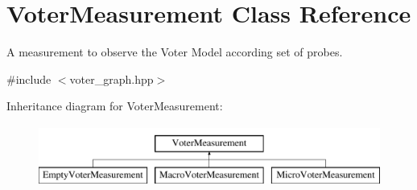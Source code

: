 \hypertarget{class_voter_measurement}{}\section{Voter\+Measurement Class Reference}
\label{class_voter_measurement}


A measurement to observe the Voter Model according set of probes.  




{\ttfamily \#include $<$voter\+\_\+graph.\+hpp$>$}

Inheritance diagram for Voter\+Measurement\+:\begin{figure}[H]
\begin{center}
\leavevmode
\includegraphics[height=2.000000cm]{class_voter_measurement}
\end{center}
\end{figure}
